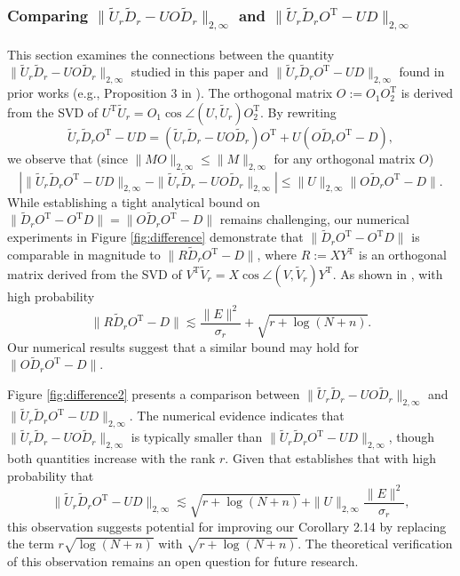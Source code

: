 \documentclass[reqno]{amsart}
\newcommand{\T}{\mathrm{T}}
\theoremstyle{plain}
\theoremstyle{definition}
\begin{document}
\subsubsection{Comparing $\| \widetilde{U}_{r}\widetilde{D}_{r} - {U}O\widetilde{D}_{r}\|_{2,\infty}$ and $\|\widetilde{U}_r \widetilde{D}_r O^\T- U D \|_{2,\infty}$}
This section examines the connections between the quantity $\| \widetilde{U}_{r}\widetilde{D}_{r} - {U}O\widetilde{D}_{r}\|_{2,\infty}$ studied in this paper and $\|\tilde{U}_r \tilde{D}_r O^\T- U D \|_{2,\infty}$ found in prior works (e.g., Proposition 3 in \cite{YW24}). The orthogonal matrix $O:=O_1 O_2^\T$ is derived from the SVD of ${U}^\T \widetilde{U}_{r} = O_1 \cos\angle(U, \widetilde{U}_{r}) O_2^\T$. By rewriting 
\[ \widetilde{U}_r \widetilde{D}_r O^\T- U D =(\widetilde{U}_r \widetilde{D}_r - UO \widetilde{D}_r)O^\T +  U (O \widetilde{D}_rO^\T - {D} ), \]
we observe that (since $\|MO\|_{2,\infty} \le \|M\|_{2,\infty}$ for any orthogonal matrix $O$)
\[ \left| \| \widetilde{U}_r \widetilde{D}_r O^\T- U D \|_{2,\infty} - \|\widetilde{U}_r \widetilde{D}_r - UO \widetilde{D}_r\|_{2,\infty} \right| \le \|U\|_{2,\infty} \|O \widetilde{D}_rO^\T - {D}\|. \]
While establishing a tight analytical bound on $\|\widetilde{D}_r O^\T - O^\T D\| = \|O\widetilde{D}_r O^\T - D\|$ remains challenging, our numerical experiments in Figure \ref{fig:difference} demonstrate that $\|\widetilde{D}_r O^\T - O^\T D\|$ is comparable in magnitude to $\|R\widetilde{D}_r O^\T - D\|$, where $R:= X Y^\T$ is an orthogonal matrix derived from the SVD of ${V}^\T \widetilde{V}_{r} = X \cos\angle(V, \widetilde{V}_{r}) Y^\T$. As shown in \cite[Lemma 16]{YW24},  with high probability  
\[\|R\widetilde{D}_r O^\T - D\| \lesssim \frac{\|E\|^2}{\sigma_r} + \sqrt{r+\log(N+n)}. \]
Our numerical results suggest that a similar bound may hold for $\|O\widetilde{D}_r O^\T -  D\|$. 

Figure \ref{fig:difference2} presents a comparison between $\| \widetilde{U}_{r}\widetilde{D}_{r} - {U}O\widetilde{D}_{r}\|_{2,\infty}$ and $\|\widetilde{U}_r \widetilde{D}_r O^\T- U D \|_{2,\infty}$. The numerical evidence indicates that  $\| \widetilde{U}_{r}\widetilde{D}_{r} - {U}O\widetilde{D}_{r}\|_{2,\infty}$ is typically smaller than $\|\widetilde{U}_r \widetilde{D}_r O^\T- U D \|_{2,\infty}$, though both quantities increase with the rank $r$. Given that \cite[Proposition 3]{YW24} establishes that with high probability that \[ \|\widetilde{U}_r \widetilde{D}_r O^\T- U D \|_{2,\infty} \lesssim \sqrt{r+\log(N+n)} + \|U\|_{2,\infty} \frac{\|E\|^2}{\sigma_r},\] this observation suggests potential for improving our Corollary 2.14 by replacing the term $r\sqrt{\log(N+n)}$ with $\sqrt{r+\log(N+n)}$. The theoretical verification of this observation remains an open question for future research.
\end{document}
